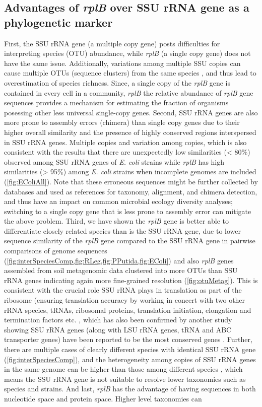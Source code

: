 \documentclass[]{msu-thesis}
\begin{document}
\subsection{Advantages of \textit{rplB} over SSU rRNA gene as a phylogenetic marker}
First, the SSU rRNA gene (a multiple copy gene) posts difficulties for interpreting species (OTU) abundance, while \textit{rplB} (a single copy gene) does not have the same issue. Additionally, variations among multiple SSU copies can cause multiple OTUs (sequence clusters) from the same species \cite{sun_intragenomic_2013}, and thus lead to overestimation of species richness. Since, a single copy of the \textit{rplB} gene is contained in every cell in a community, \textit{rplB} the relative abundance of \textit{rplB} gene sequences provides a mechanism for estimating the fraction of organisms posessing other less universal single-copy genes. Second, SSU rRNA genes are also more prone to assembly errors (chimera) than single copy genes due to their higher overall similarity and the presence of highly conserved regions interspersed in SSU rRNA genes. Multiple copies and variation among copies, which is also consistent with the results that there are unexpectedly low similarities (< 80\%) observed among SSU rRNA genes of \textit{E. coli} strains while \textit{rplB} has high similarities (> 95\%) among \textit{E. coli} strains when incomplete genomes are included (\cref{fig:EColiAll}). Note that these erroneous sequences might be further collected by databases and used as references for taxonomy, alignment, and chimera detection, and thus have an impact on common microbial ecology diversity analyses; switching to a single copy gene that is less prone to assembly error can mitigate the above problem. Third, we have shown the \textit{rplB} gene is better able to differentiate closely related species than is the SSU rRNA gene, due to lower sequence similarity of the \textit{rplB} gene compared to the SSU rRNA gene in pairwise comparisons of genome sequences (\cref{fig:interSpeciesComp,fig:RLeg,fig:PPutida,fig:EColi}) and also \textit{rplB} genes assembled from soil metagenomic data clustered into more OTUs than SSU rRNA genes indicating again more fine-grained resolution (\cref{fig:otuMetag}). This is consistent with the crucial role SSU rRNA plays in translation as part of the ribosome (ensuring translation accuracy by working in concert with two other rRNA species, tRNAs, ribosomal proteins, translation initiation, elongation and termination factors etc. \cite{carter_functional_2000}, which has also been confirmed by another study showing SSU rRNA genes (along with LSU rRNA genes, tRNA and ABC transporter genes) have been reported to be the most conserved genes \cite{isenbarger_most_2008}. Further, there are multiple cases of clearly different species with identical SSU rRNA gene (\cref{fig:interSpeciesComp}), and the heterogeneity among copies of SSU rRNA genes in the same genome can be higher than those among different species \cite{sun_intragenomic_2013}, which means the SSU rRNA gene is not suitable to resolve lower taxonomies such as species and strains. And last, \textit{rplB} has the advantage of having sequences in both nucleotide space and protein space. Higher level taxonomies can 
\end{document}
